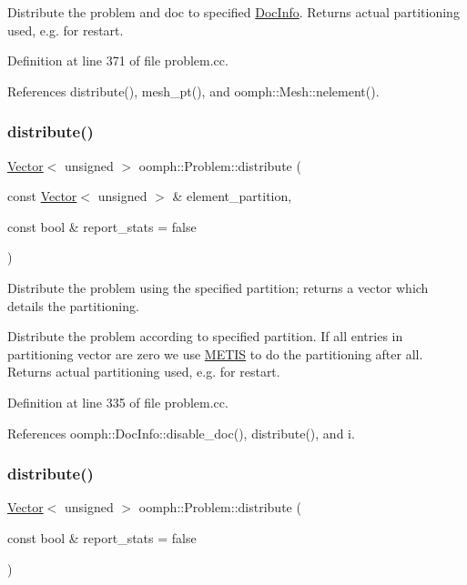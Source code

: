 Distribute the problem and doc to specified \hyperlink{classoomph_1_1DocInfo}{Doc\+Info}. Returns actual partitioning used, e.\+g. for restart. 

Definition at line 371 of file problem.\+cc.



References distribute(), mesh\+\_\+pt(), and oomph\+::\+Mesh\+::nelement().

\mbox{\label{classoomph_1_1Problem_aa35f7ff2b0075cfd4dda519858a65d6c}} 
\subsubsection{\texorpdfstring{distribute()}{distribute()}\hspace{0.1cm}{\footnotesize\ttfamily [3/4]}}
{\footnotesize\ttfamily \hyperlink{classoomph_1_1Vector}{Vector}$<$ unsigned $>$ oomph\+::\+Problem\+::distribute (\begin{DoxyParamCaption}\item[{const \hyperlink{classoomph_1_1Vector}{Vector}$<$ unsigned $>$ \&}]{element\+\_\+partition,  }\item[{const bool \&}]{report\+\_\+stats = {\ttfamily false} }\end{DoxyParamCaption})}



Distribute the problem using the specified partition; returns a vector which details the partitioning. 

Distribute the problem according to specified partition. If all entries in partitioning vector are zero we use \hyperlink{namespaceoomph_1_1METIS}{M\+E\+T\+IS} to do the partitioning after all. Returns actual partitioning used, e.\+g. for restart. 

Definition at line 335 of file problem.\+cc.



References oomph\+::\+Doc\+Info\+::disable\+\_\+doc(), distribute(), and i.

\mbox{\label{classoomph_1_1Problem_af0365ddbe425b730ece6a575db1cd7dd}} 
\subsubsection{\texorpdfstring{distribute()}{distribute()}\hspace{0.1cm}{\footnotesize\ttfamily [4/4]}}
{\footnotesize\ttfamily \hyperlink{classoomph_1_1Vector}{Vector}$<$ unsigned $>$ oomph\+::\+Problem\+::distribute (\begin{DoxyParamCaption}\item[{const bool \&}]{report\+\_\+stats = {\ttfamily false} }\end{DoxyParamCaption})}



